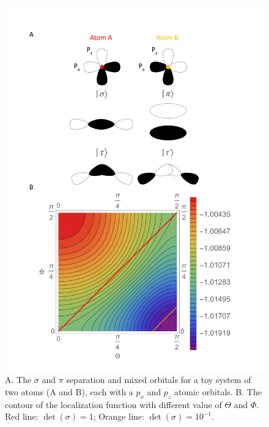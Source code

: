 \documentclass[aps,prl,reprint,amsmath,amssymb]{revtex4-1}
\begin{document}
\begin{figure}[hbpt]
\centering
\includegraphics[scale=0.35]{sigma_pi_mixing.pdf}
\caption{A. The $\sigma$ and $\pi$ separation and mixed orbitals for a toy system of two atoms (A and B), each with a $p_x$ and $p_z$ atomic orbitals. B. The contour of the localization function with different value of $\Theta$ and $\Phi$. Red line: $\det(\sigma) = 1$; Orange line: $\det(\sigma) = 10^{-1}$.}
\label{fig:sigma_pi_mixing}
\end{figure}
\end{document}
